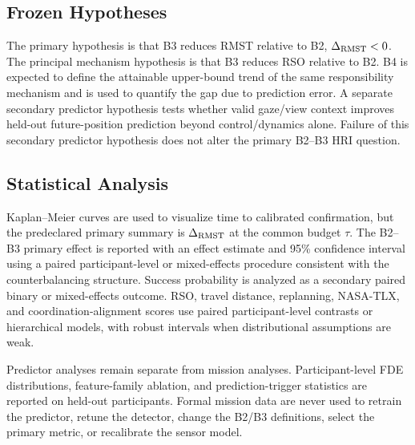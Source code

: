 \documentclass[conference]{IEEEtran}
\begin{document}
\subsection{Frozen Hypotheses}

The primary hypothesis is that B3 reduces RMST relative to B2,
$\Delta_{\rm RMST}<0$. The principal mechanism hypothesis is that B3 reduces
RSO relative to B2. B4 is expected to define the attainable upper-bound trend
of the same responsibility mechanism and is used to quantify the gap due to
prediction error. A separate secondary predictor hypothesis tests whether
valid gaze/view context improves held-out future-position prediction beyond
control/dynamics alone. Failure of this secondary predictor hypothesis does not
alter the primary B2--B3 HRI question.

\subsection{Statistical Analysis}

Kaplan--Meier curves are used to visualize time to calibrated confirmation, but
the predeclared primary summary is $\Delta_{\rm RMST}$ at the common budget
$\tau$. The B2--B3 primary effect is reported with an effect estimate and 95\%
confidence interval using a paired participant-level or mixed-effects procedure
consistent with the counterbalancing structure. Success probability is analyzed
as a secondary paired binary or mixed-effects outcome. RSO, travel distance,
replanning, NASA-TLX, and coordination-alignment scores use paired
participant-level contrasts or hierarchical models, with robust intervals when
distributional assumptions are weak.

Predictor analyses remain separate from mission analyses. Participant-level
FDE distributions, feature-family ablation, and prediction-trigger statistics
are reported on held-out participants. Formal mission data are never used to
retrain the predictor, retune the detector, change the B2/B3 definitions,
select the primary metric, or recalibrate the sensor model.
\end{document}
